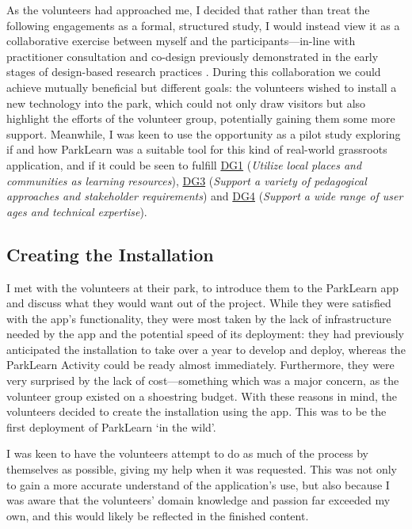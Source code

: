 As the volunteers had approached me, I decided that rather than treat the following engagements as a formal, structured study, I would instead view it as a collaborative exercise between myself and the participants---in-line with practitioner consultation and co-design previously demonstrated in the early stages of design-based research practices \citep{herrington2009}. During this collaboration we could achieve mutually beneficial but different goals: the volunteers wished to install a new technology into the park, which could not only draw visitors but also highlight the efforts of the volunteer group, potentially gaining them some more support. Meanwhile, I was keen to use the opportunity as a pilot study exploring if and how ParkLearn was a suitable tool for this kind of real-world grassroots application, and if it could be seen to fulfill \hyperref[DG1]{DG1} (\textit{Utilize local places and communities as learning resources}), \hyperref[DG3]{DG3} (\textit{Support a variety of pedagogical approaches and stakeholder requirements}) and \hyperref[DG4]{DG4} (\textit{Support a wide range of user ages and technical expertise}).

\subsection{Creating the Installation}

I met with the volunteers at their park, to introduce them to the ParkLearn app and discuss what they would want out of the project. While they were satisfied with the app's functionality, they were most taken by the lack of infrastructure needed by the app and the potential speed of its deployment: they had previously anticipated the installation to take over a year to develop and deploy, whereas the ParkLearn Activity could be ready almost immediately. Furthermore, they were very surprised by the lack of cost---something which was a major concern, as the volunteer group existed on a shoestring budget. With these reasons in mind, the volunteers decided to create the installation using the app. This was to be the first deployment of ParkLearn `in the wild'.

I was keen to have the volunteers attempt to do as much of the process by themselves as possible, giving my help when it was requested. This was not only to gain a more accurate understand of the application's use, but also because I was aware that the volunteers' domain knowledge and passion far exceeded my own, and this would likely be reflected in the finished content.

